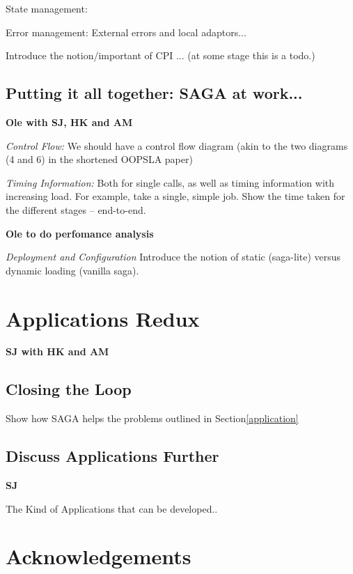 \documentclass[10pt,letterpaper]{article}
\begin{document}
State management:

Error management: External errors and local adaptors...

Introduce the notion/important of CPI ... (at some stage this is a
todo.)

\subsection{Putting it all together: SAGA at work...}{\bf Ole with SJ,
  HK and AM}

{\it Control Flow:} We should have a control flow diagram (akin to the
two diagrams (4 and 6) in the shortened OOPSLA paper)

{\it Timing Information:} Both for single calls, as well as timing
information with increasing load.  For example, take a single, simple
job. Show the time taken for the different stages -- end-to-end.

{\bf Ole to do perfomance analysis}

{\it Deployment and Configuration} Introduce the notion of static
(saga-lite) versus dynamic loading (vanilla saga).

\section{Applications Redux}{\bf SJ with HK and AM}

\subsection{Closing the Loop}

Show how SAGA helps the problems outlined in Section\ref{application}

\subsection{Discuss Applications Further} {\bf SJ}
 
The Kind of Applications that can be developed..

\section*{Acknowledgements}

%


\end{document}
